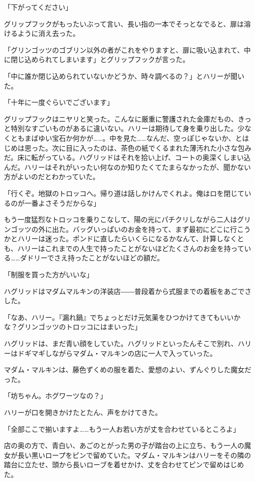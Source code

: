 \documentclass[10pt,a4paper]{article}
\begin{document}
\begin{CJK}{UTF8}{min}
「下がってください」

グリップフックがもったいぶって言い、長い指の一本でそっとなでると、扉は溶けるように消え去った。

「グリンゴッツのゴブリン以外の者がこれをやりますと、扉に吸い込まれて、中に閉じ込められてしまいます」とグリップフックが言った。

「中に誰か閉じ込められていないかどうか、時々調べるの？」とハリーが聞いた。

「十年に一度ぐらいでございます」

グリップフックはニヤリと笑った。こんなに厳重に警護された金庫だもの、きっと特別なすごいものがあるに違いない。ハリーは期待して身を乗り出した。少なくともまばゆい宝石か何かが……。中を見た……なんだ、空っぽじゃないか、とはじめは思った。次に目に入ったのは、茶色の紙でくるまれた薄汚れた小さな包みだ。床に転がっている。ハグリッドはそれを拾い上げ、コートの奥深くしまい込んだ。ハリーはそれがいったい何なのか知りたくてたまらなかったが、聞かない方がよいのだとわかっていた。

「行くぞ。地獄のトロッコへ。帰り道は話しかけんでくれよ。俺はロを閉じているのが一番よさそうだからな」



もう一度猛烈なトロッコを乗りこなして、陽の光にパチクリしながら二人はグリンゴッツの外に出た。バッグいっぱいのお金を持って、まず最初にどこに行こうかとハリーは迷った。ポンドに直したらいくらになるかなんて、計算しなくとも、ハリーはこれまでの人生で持ったことがないほどたくさんのお金を持っている……ダドリーでさえ持ったことがないほどの額だ。

「制服を買った方がいいな」

ハグリッドはマダムマルキンの洋装店――普段着から式服までの着板をあごでさした。

「なあ、ハリー。『漏れ鍋』でちょっとだけ元気薬をひつかけてきてもいいかな？グリンゴッツのトロッコにはまいった」

ハグリッドは、まだ青い顔をしていた。ハグリッドといったんそこで別れ、ハリーはドギマギしながらマダム・マルキンの店に一人で入っていった。

マダム・マルキンは、藤色ずくめの服を着た、愛想のよい、ずんぐりした魔女だった。

「坊ちゃん。ホグワーツなの？」

ハリーが口を開きかけたとたん、声をかけてきた。

「全部ここで揃いますよ……もう一人お若い方が丈を合わせているところよ」

店の奥の方で、青白い、あごのとがった男の子が踏台の上に立ち、もう一人の魔女が長い黒いロープをピンで留めていた。マダム・マルキンはハリーをその隣の踏台に立たせ、頭から長いローブを着せかけ、丈を合わせてピンで留めはじめた。


\end{CJK}
\end{document}
